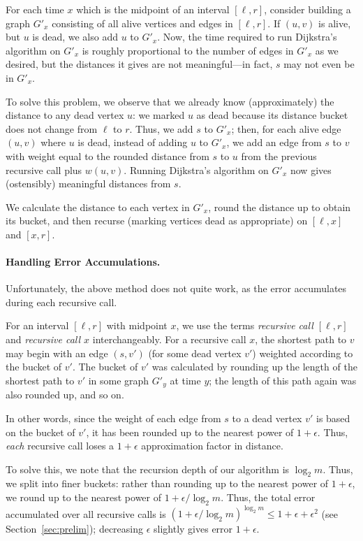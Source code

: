 \documentclass[11pt]{article}
\begin{document}
For each time $x$  which is the midpoint of an interval $[\ell, r]$, consider building a graph $G'_x$
consisting of all alive vertices and edges in $[\ell, r]$.  If $(u,v)$ is alive, but $u$ is dead, we also add $u$ to $G'_x$.
Now, the time required to run Dijkstra's algorithm on $G'_x$ is roughly proportional to the number of edges in $G'_x$ as we desired, but the distances it gives are not meaningful---in fact, $s$ may not even be in $G'_x$.

To solve this problem, we observe that we already know (approximately) the distance to any dead vertex $u$: we marked $u$ as dead because its distance bucket does not change from $\ell$ to $r$.  Thus, we add $s$ to $G'_x$; then, for each alive edge $(u,v)$ where $u$ is dead, instead of adding $u$ to $G'_x$, we add an edge from $s$ to $v$ with weight equal to the rounded distance from $s$ to $u$ from the previous recursive call plus $w(u,v)$.
Running Dijkstra's algorithm on $G'_x$ now gives (ostensibly) meaningful distances from $s$.

We calculate the distance to each vertex in $G'_x$, round the distance up to obtain its bucket, and then recurse (marking vertices dead as appropriate) on $[\ell, x]$ and $[x, r]$.

\paragraph{Handling Error Accumulations.}

Unfortunately, the above method does not quite work, as the error accumulates during each recursive call.  

For an interval $[\ell, r]$ with midpoint $x$, we use the terms \emph{recursive call $[\ell, r]$} and \emph{recursive call $x$} interchangeably.
For a recursive call $x$, the shortest path to $v$ may begin with an edge $(s, v')$ (for some dead vertex $v'$) weighted according to the bucket of $v'$.  The bucket of $v'$ was calculated by rounding up the length of the shortest path to $v'$ in some graph $G'_{y}$ at time $y$; the length of this path again was also rounded up, and so on.

In other words, since the weight of each edge from $s$ to a dead vertex $v'$ is based on the bucket of $v'$, it has been rounded up to the nearest power of $1 + \epsilon$.  Thus, \emph{each} recursive call loses a $1 + \epsilon$ approximation factor in distance.

To solve this, we note that the recursion depth of our algorithm is $\log_2 m$.  Thus, we split into finer buckets: rather than rounding up to the nearest power of $1 + \epsilon$, we round up to the nearest power of $1 + \epsilon/\log_2 m$.  Thus, the total error accumulated over all recursive calls is $(1 + \epsilon/\log_2 m)^{\log_2 m} \leq 1 + \epsilon + \epsilon^2$ (see Section~\ref{sec:prelim}); decreasing $\epsilon$ slightly gives error $1 + \epsilon$.  
\end{document}

